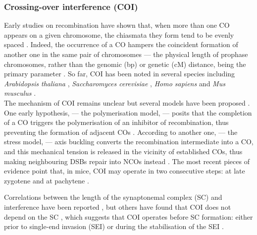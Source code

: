 \subsubsection{Crossing-over interference (COI)}
Early studies on recombination \citep{sturtevant1915behavior,muller1916mechanism} have shown that, when more than one CO appears on a given chromosome, the chiasmata they form tend to be evenly spaced \citep{jones1967control, jones1974correlated, jones1984control,jones2006meiotic}.
Indeed, the occurrence of a CO hampers the coincident formation of another one in the same pair of chromosomes \citep{vanveen2003meiosis,hillers2004crossover} — the physical length of prophase chromosomes, rather than the genomic (bp) or genetic (cM) distance, being the primary parameter \citep{zhang2014crossover,wang2015meiotic}.
So far, COI has been noted in several species including \textit{Arabidopsis thaliana} \citep{drouaud2007sexspecific}, \textit{Saccharomyces cerevisiae} \citep{shinohara2003crossover}, \textit{Homo sapiens} \citep{laurie1985further,broman2000characterization} and \textit{Mus musculus} \citep{lawrie1995chiasma,anderson1999distribution,broman2002crossover}.\\

The mechanism of COI remains unclear but several models have been proposed \citep[reviewed in][]{youds2011choice}.
One early hypothesis, — the polymerisation model, — posits that the completion of a CO triggers the polymerisation of an inhibitor of recombination, thus preventing the formation of adjacent COs \citep{maguire1988crossover,king1990polymerization}.
According to another one, — the stress model, — axis buckling converts the recombination intermediate into a CO, and this mechanical tension is released in the vicinity of established COs, thus making neighbouring DSBs repair into NCOs instead \citep{borner2004crossover,kleckner2004mechanical}.
The most recent pieces of evidence point that, in mice, COI may operate in two consecutive steps: at late zygotene and at pachytene \citep{boer2006two}.

Correlations between the length of the synaptonemal complex (SC) and interference have been reported \citep{sym1994crossover,lynn2002covariation,petkov2007crossover}, but others have found that COI does not depend on the SC \citep{deboer2007meiotic,shodhan2014msh4}, which suggests that COI operates before SC formation: either prior to single-end invasion (SEI) \citep{hunter2001singleend, bishop2004early} or during the stabilisation of the SEI \citep{shinohara2008crossover}.\\


